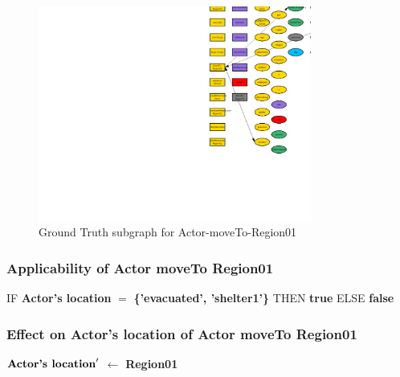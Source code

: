 \documentclass{article}%
\begin{document}
\begin{figure}[ht]%
\centering%
\includegraphics[width=0.8\textwidth]{images/Actor-moveTo-Region01.png}%
\caption{Ground Truth subgraph for Actor{-}moveTo{-}Region01}%
\end{figure}

%
\subsubsection{Applicability of Actor moveTo Region01}%
\label{ssubsec:Applicability of Actor moveTo Region01}%
\begin{flushleft}%
IF %
\textbf{Actor's location}%
$=$%
\textbf{\{'evacuated', 'shelter1'\}}%
\linebreak%
\hspace*{2em}%
THEN %
\textbf{true}%
\linebreak%
\hspace*{2em}%
ELSE %
\textbf{false}%
\end{flushleft}

%
\subsubsection{Effect on Actor's location of Actor moveTo Region01}%
\label{ssubsec:Effect on Actor's location of Actor moveTo Region01}%
\begin{flushleft}%
$\mbox{\textbf{Actor's location}} '$%
$\leftarrow$%
\textbf{Region01}%
\end{flushleft}

%
\end{document}
